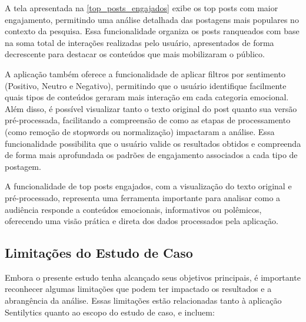 \documentclass[
	12pt,				%
	oneside,			%
	a4paper,			%
	english,			%
	french,				%
	spanish,			%
	brazil				%
	]{abntex2}
\begin{document}
A tela apresentada na \autoref{top_posts_engajados} exibe os top posts
com maior engajamento, permitindo uma análise detalhada das postagens
mais populares no contexto da pesquisa. Essa funcionalidade organiza os
posts ranqueados com base na soma total de interações realizadas pelo
usuário, apresentados de forma decrescente para destacar os conteúdos
que mais mobilizaram o público.

A aplicação também oferece a funcionalidade de aplicar filtros por
sentimento (Positivo, Neutro e Negativo), permitindo que o usuário
identifique facilmente quais tipos de conteúdos geraram mais interação
em cada categoria emocional. Além disso, é possível visualizar tanto o
texto original do post quanto sua versão pré-processada, facilitando a
compreensão de como as etapas de processamento (como remoção de
stopwords ou normalização) impactaram a análise. Essa funcionalidade
possibilita que o usuário valide os resultados obtidos e compreenda de
forma mais aprofundada os padrões de engajamento associados a cada tipo
de postagem.

A funcionalidade de top posts engajados, com a visualização do texto
original e pré-processado, representa uma ferramenta importante para
analisar como a audiência responde a conteúdos emocionais, informativos
ou polêmicos, oferecendo uma visão prática e direta dos dados
processados pela aplicação.

\hypertarget{limitauxe7uxf5es-do-estudo-de-caso}{%
\subsection{Limitações do Estudo de
Caso}\label{limitauxe7uxf5es-do-estudo-de-caso}}

Embora o presente estudo tenha alcançado seus objetivos principais, é
importante reconhecer algumas limitações que podem ter impactado os
resultados e a abrangência da análise. Essas limitações estão
relacionadas tanto à aplicação Sentilytics quanto ao escopo do estudo de
caso, e incluem:
\end{document}
